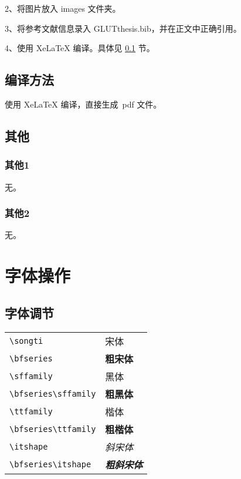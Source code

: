 2、将图片放入 images 文件夹。

3、将参考文献信息录入 GLUTthesis.bib，并在正文中正确引用。

4、使用 XeLaTeX 编译。具体见 \ref{sec-compile} 节。



\subsection{编译方法} \label{sec-compile}

使用 XeLaTeX 编译，直接生成~pdf 文件。


\subsection{其他}
\subsubsection{其他1}
无。
\subsubsection{其他2}
无。
\newpage 


\section{字体操作}
\subsection{字体调节}

\begin{tabular}{ll}
	\verb|\songti|   & {\songti 宋体}   \\
	\verb|\bfseries|    & {\bfseries 粗宋体}    \\
	\verb|\sffamily| & {\sffamily 黑体} \\
	\verb|\bfseries\sffamily| & {\bfseries\sffamily 粗黑体} \\
  \verb|\ttfamily|   & {\ttfamily 楷体}   \\
  \verb|\bfseries\ttfamily|   & {\bfseries\ttfamily 粗楷体}   \\
  \verb|\itshape|   & {\itshape 斜宋体}   \\
  \verb|\bfseries\itshape|   & {\bfseries\itshape 粗斜宋体}   \\

\end{tabular}
\textbf{}

